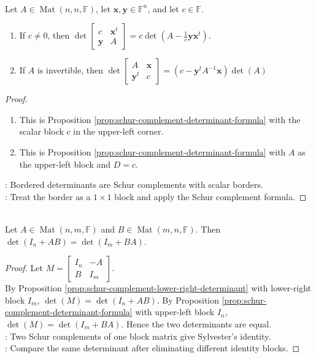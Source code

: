 \begin{proposition} \label{prop:bordered-determinant-formulas} \\
Let $A\in\operatorname{Mat}(n,n,\mathbb{F})$, let $\mathbf{x},\mathbf{y}\in\mathbb{F}^n$, and let $c\in\mathbb{F}$.
\begin{enumerate}[label=(\roman*)]
\setlength{\itemsep}{0pt}
\item If $c\neq0$, then $\det
\begin{bmatrix}
c & \mathbf{x}^t\\
\mathbf{y} & A
\end{bmatrix}
=
c\det\left(A-\frac{1}{c}\mathbf{y}\mathbf{x}^t\right)$.
\item If $A$ is invertible, then $\det
\begin{bmatrix}
A & \mathbf{x}\\
\mathbf{y}^t & c
\end{bmatrix}
=
\left(c-\mathbf{y}^tA^{-1}\mathbf{x}\right)\det(A)$
\end{enumerate}
\begin{proof}
\begin{enumerate}[label=(\roman*)]
\setlength{\itemsep}{0pt}
\item This is Proposition \ref{prop:schur-complement-determinant-formula} with the scalar block $c$ in the upper-left corner.
\item This is Proposition \ref{prop:schur-complement-determinant-formula} with $A$ as the upper-left block and $D=c$.
\end{enumerate}
: Bordered determinants are Schur complements with scalar borders.\\
: Treat the border as a $1\times1$ block and apply the Schur complement formula.
\end{proof}
\end{proposition}

\begin{theorem} \label{thm:sylvester-determinant-identity} \\
Let $A\in\operatorname{Mat}(n,m,\mathbb{F})$ and $B\in\operatorname{Mat}(m,n,\mathbb{F})$. Then $\det(I_n+AB)=\det(I_m+BA)$.
\begin{proof}
Let $M=
\begin{bmatrix}
I_n & -A\\
B & I_m
\end{bmatrix}$.\\
By Proposition \ref{prop:schur-complement-lower-right-determinant} with lower-right block $I_m$, $\det(M)=\det(I_n+AB)$. By Proposition \ref{prop:schur-complement-determinant-formula} with upper-left block $I_n$, $\det(M)=\det(I_m+BA)$. Hence the two determinants are equal.\\
: Two Schur complements of one block matrix give Sylvester's identity.\\
: Compare the same determinant after eliminating different identity blocks.
\end{proof}
\end{theorem}

